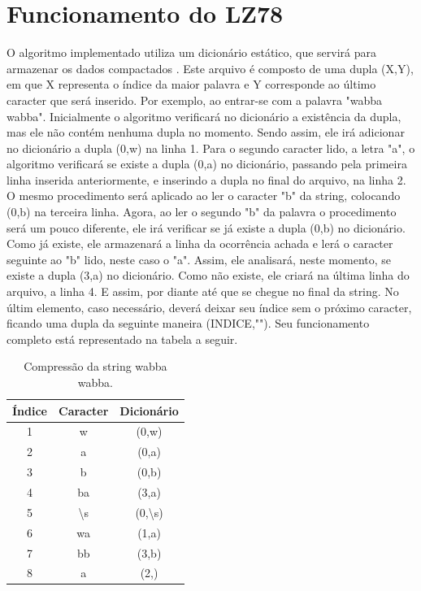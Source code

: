 \documentclass[
	article,			
	11pt,				
	oneside,			
	a4paper,			
	english,			
	brazil,				
	sumario=tradicional
	]{abntex2}
\begin{document}
\section{Funcionamento do LZ78}
O algoritmo implementado utiliza um dicionário estático, que servirá para armazenar os dados compactados \cite{jziv1977}. Este arquivo é composto de uma dupla (X,Y), em que X representa o índice da maior palavra e Y corresponde ao último caracter que será inserido. Por exemplo, ao entrar-se com a palavra "wabba wabba". Inicialmente o algoritmo verificará no dicionário a existência da dupla, mas ele não contém nenhuma dupla no momento. Sendo assim, ele irá adicionar no dicionário a dupla (0,w) na linha 1. Para o segundo caracter lido, a letra "a", o algoritmo verificará se existe a dupla (0,a) no dicionário, passando pela primeira linha inserida anteriormente, e inserindo a dupla no final do arquivo, na linha 2. O mesmo procedimento será aplicado ao ler o caracter "b" da string, colocando (0,b) na terceira linha. Agora, ao ler o segundo "b" da palavra o procedimento será um pouco diferente, ele irá verificar se já existe a dupla (0,b) no dicionário. Como já existe, ele armazenará a linha da ocorrência achada e lerá o caracter seguinte ao "b" lido, neste caso o "a". Assim, ele analisará, neste momento, se existe a dupla (3,a) no dicionário. Como não existe, ele criará na última linha do arquivo, a linha 4. E assim, por diante até que se chegue no final da string. No últim elemento, caso necessário, deverá deixar seu índice sem o próximo caracter, ficando uma dupla da seguinte maneira (INDICE,""). Seu funcionamento completo está representado na tabela a seguir. 

\begin{table}[h!]
  \begin{center}
    \label{tab:table1}
     \begin{tabular}{c|c|c} %
      \textbf{Índice} & \textbf{Caracter} & \textbf{Dicionário}\\
      \hline
      1 & w & (0,w)\\
      2 & a & (0,a)\\
      3 & b & (0,b)\\
      4 & ba & (3,a)\\
      5 & \textbackslash s & (0,\textbackslash s)\\
      6 & wa & (1,a)\\
      7 & bb & (3,b)\\
      8 & a & (2,)\\
    \end{tabular}
    \caption{Compressão da string wabba wabba.}
  \end{center}
\end{table}
\end{document}
